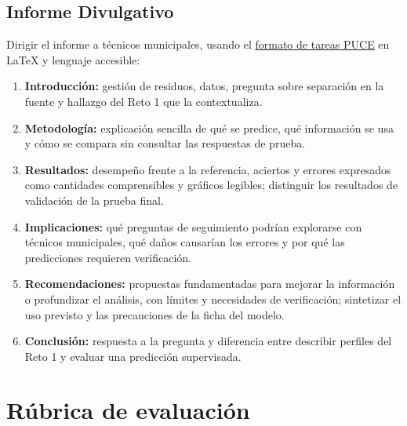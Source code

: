 \documentclass[a4,11pt]{aleph-notas}
\begin{document}
\subsection{Informe Divulgativo}
Dirigir el informe a técnicos municipales, usando el \href{https://www.overleaf.com/latex/templates/formato-tareas-puce/nkgwqjtcrvms}{formato de tareas PUCE} en \LaTeX{} y lenguaje accesible:

\begin{enumerate}[leftmargin=*, label={\textbf{\arabic*.}}]
    \item \textbf{Introducción:} gestión de residuos, datos, pregunta sobre separación en la fuente y hallazgo del Reto 1 que la contextualiza.

    \item \textbf{Metodología:} explicación sencilla de qué se predice, qué información se usa y cómo se compara sin consultar las respuestas de prueba.

    \item \textbf{Resultados:} desempeño frente a la referencia, aciertos y errores expresados como cantidades comprensibles y gráficos legibles; distinguir los resultados de validación de la prueba final.

    \item \textbf{Implicaciones:} qué preguntas de seguimiento podrían explorarse con técnicos municipales, qué daños causarían los errores y por qué las predicciones requieren verificación.

    \item \textbf{Recomendaciones:} propuestas fundamentadas para mejorar la información o profundizar el análisis, con límites y necesidades de verificación; sintetizar el uso previsto y las precauciones de la ficha del modelo.

    \item \textbf{Conclusión:} respuesta a la pregunta y diferencia entre describir perfiles del Reto 1 y evaluar una predicción supervisada.
\end{enumerate}

\section{Rúbrica de evaluación}
\end{document}
